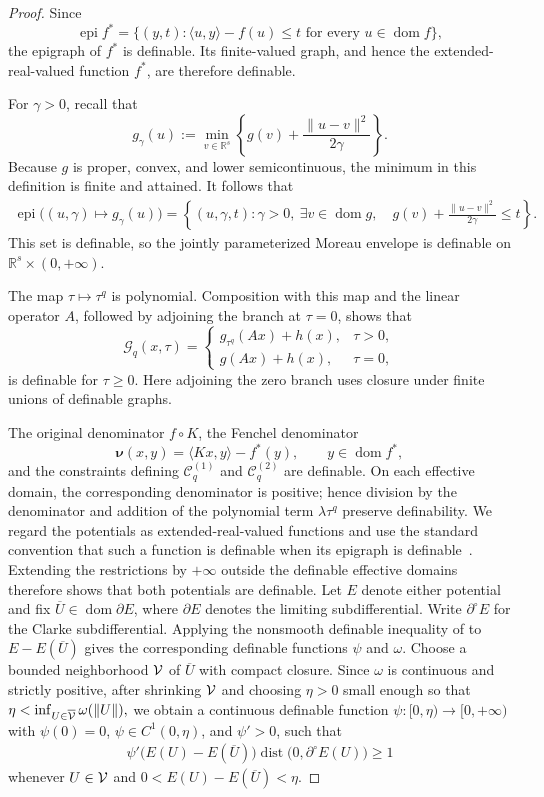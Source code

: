 \documentclass[9pt]{article}
\numberwithin{equation}{section}
\theoremstyle{definition}
\theoremstyle{remark}
\newcommand{\R}{\mathbb R}
\newcommand{\Gcal}{\mathcal G}
\newcommand{\Ccal}{\mathcal C}
\newcommand{\nuf}{\boldsymbol\nu}
\DeclareMathOperator{\dist}{dist}
\DeclareMathOperator{\dom}{dom}
\DeclareMathOperator{\epi}{epi}
\begin{document}
\begin{proof}
Since
\[
 \epi f^*
 =\bigl\{(y,t):
     \langle u,y\rangle-f(u)\leq t
     \text{ for every }u\in\dom f\bigr\},
\]
the epigraph of $f^*$ is definable. Its finite-valued graph, and hence
the extended-real-valued function $f^*$, are therefore definable.

For $\gamma>0$, recall that
\[
 g_\gamma(u)
 :=\min_{v\in\R^s}
 \left\{g(v)+\frac{\|u-v\|^2}{2\gamma}\right\}.
\]
Because $g$ is proper, convex, and lower semicontinuous,
the minimum in this definition is finite and attained. It follows that
\begin{align*}
 \epi\bigl((u,\gamma)\mapsto g_\gamma(u)\bigr)=
 \left\{(u,\gamma,t):
   \gamma>0,\ \exists v\in\dom g,\quad
   g(v)+\frac{\|u-v\|^2}{2\gamma}\leq t
 \right\}.
\end{align*}
This set is definable, so the jointly parameterized Moreau envelope is
definable on $\R^s\times(0,+\infty)$.

The map $\tau\mapsto\tau^q$ is polynomial. Composition with this map
and the linear operator $A$, followed by adjoining the branch at
$\tau=0$, shows that
\[
 \Gcal_q(x,\tau)
 =\begin{cases}
   g_{\tau^q}(Ax)+h(x),&\tau>0,\\
   g(Ax)+h(x),&\tau=0,
  \end{cases}
\]
is definable for $\tau\geq0$. Here adjoining the zero branch uses closure
under finite unions of definable graphs.


The original denominator $f\circ K$, the Fenchel denominator
\[
 \nuf(x,y)=\langle Kx,y\rangle-f^*(y),
 \qquad y\in\dom f^*,
\]
and the constraints defining $\Ccal_q^{(1)}$ and $\Ccal_q^{(2)}$ are
definable. On each effective domain, the corresponding denominator is
positive; hence division by the denominator and addition of the
polynomial term $\lambda\tau^q$ preserve definability. We regard the
potentials as extended-real-valued functions and use the standard
convention that such a function is definable when its epigraph is
definable~\cite{BolteDaniilidisLewisShiota2007}. Extending the
restrictions by $+\infty$ outside the definable effective domains
therefore shows that both potentials are definable.
Let $E$ denote either
potential and fix $\overline U\in\dom\partial E$, where $\partial E$
denotes the limiting subdifferential. Write $\partial^\circ E$ for the
Clarke subdifferential. Applying the nonsmooth definable inequality of
\cite[Theorem~14]{BolteDaniilidisLewisShiota2007} to
$E-E(\overline U)$ gives the corresponding definable functions
$\psi$ and $\omega$. Choose a bounded neighborhood $\cal V$ of
$\overline U$ with compact closure. Since $\omega$ is continuous and
strictly positive, after shrinking $\cal V$ and choosing $\eta>0$
small enough so that
$
 \eta<\inf_{U\in\overline{\cal V}}\omega(\|U\|),
$
we obtain a continuous definable function
$\psi:[0,\eta)\to[0,+\infty)$ with $\psi(0)=0$,
$\psi\in C^1(0,\eta)$, and $\psi'>0$, such that
\begin{eqnarray}\label{eq:Clarke-KL-definable}
 \psi'\bigl(E(U)-E(\overline U)\bigr)
 \dist\bigl(0,\partial^\circ E(U)\bigr)\geq1
\end{eqnarray}
whenever $U\in {\cal V}$ and
$0<E(U)-E(\overline U)<\eta$.



\end{proof}
\end{document}
